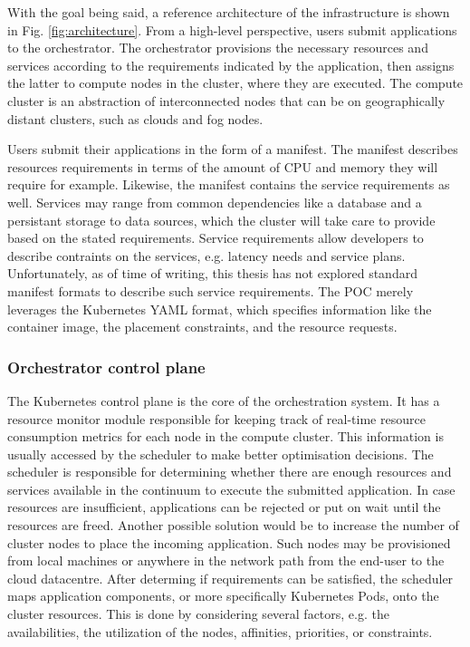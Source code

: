 With the goal being said, a reference architecture of the infrastructure is shown in Fig. \ref{fig:architecture}. From a high-level perspective, users submit applications to the orchestrator. The orchestrator provisions the necessary resources and services according to the requirements indicated by the application, then assigns the latter to compute nodes in the cluster, where they are executed. The compute cluster is an abstraction of interconnected nodes that can be on geographically distant clusters, such as clouds and fog nodes.

Users submit their applications in the form of a manifest. The manifest describes resources requirements in terms of the amount of CPU and memory they will require for example. Likewise, the manifest contains the service requirements as well. Services may range from common dependencies like a database and a persistant storage to data sources, which the cluster will take care to provide based on the stated requirements. Service requirements allow developers to describe contraints on the services, e.g. latency needs and service plans. Unfortunately, as of time of writing, this thesis has not explored standard manifest formats to describe such service requirements. The POC merely leverages the Kubernetes YAML format, which specifies information like the container image, the placement constraints, and the resource requests.

\subsubsection{Orchestrator control plane}

The Kubernetes control plane is the core of the orchestration system. It has a resource monitor module responsible for keeping track of real-time resource consumption metrics for each node in the compute cluster. This information is usually accessed by the scheduler to make better optimisation decisions. The scheduler is responsible for determining whether there are enough resources and services available in the continuum to execute the submitted application. In case resources are insufficient, applications can be rejected or put on wait until the resources are freed. Another possible solution would be to increase the number of cluster nodes to place the incoming application. Such nodes may be provisioned from local machines or anywhere in the network path from the end-user to the cloud datacentre. After determing if requirements can be satisfied, the scheduler maps application components, or more specifically Kubernetes Pods, onto the cluster resources. This is done by considering several factors, e.g. the availabilities, the utilization of the nodes, affinities, priorities, or constraints.

